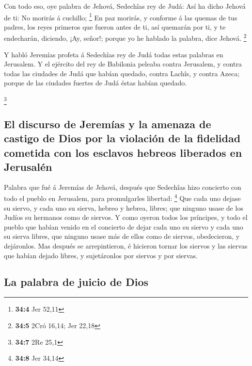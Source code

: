  Con todo eso, oye palabra de Jehová, Sedechîas rey de
Judá: Así ha dicho Jehová de ti: No morirás á cuchillo; \footnote{\textbf{34:4}
  Jer 52,11}  En paz morirás, y conforme á las quemas de
tus padres, los reyes primeros que fueron antes de ti, así quemarán por
ti, y te endecharán, diciendo, ¡Ay, señor!; porque yo he hablado la
palabra, dice Jehová. \footnote{\textbf{34:5} 2Cró 16,14; Jer 22,18}

 Y habló Jeremías profeta á Sedechîas rey de Judá todas
estas palabras en Jerusalem.  Y el ejército del rey de
Babilonia peleaba contra Jerusalem, y contra todas las ciudades de Judá
que habían quedado, contra Lachîs, y contra Azeca; porque de las
ciudades fuertes de Judá éstas habían quedado.

\footnote{\textbf{34:7} 2Re 25,1}

\hypertarget{el-discurso-de-jeremuxedas-y-la-amenaza-de-castigo-de-dios-por-la-violaciuxf3n-de-la-fidelidad-cometida-con-los-esclavos-hebreos-liberados-en-jerusaluxe9n}{%
\subsection{El discurso de Jeremías y la amenaza de castigo de Dios por
la violación de la fidelidad cometida con los esclavos hebreos liberados
en
Jerusalén}\label{el-discurso-de-jeremuxedas-y-la-amenaza-de-castigo-de-dios-por-la-violaciuxf3n-de-la-fidelidad-cometida-con-los-esclavos-hebreos-liberados-en-jerusaluxe9n}}

 Palabra que fué á Jeremías de Jehová, después que
Sedechîas hizo concierto con todo el pueblo en Jerusalem, para
promulgarles libertad: \footnote{\textbf{34:8} Jer 34,14} 
Que cada uno dejase su siervo, y cada uno su sierva, hebreo y hebrea,
libres; que ninguno usase de los Judíos su hermanos como de siervos.
 Y como oyeron todos los príncipes, y todo el pueblo que
habían venido en el concierto de dejar cada uno su siervo y cada uno su
sierva libres, que ninguno usase más de ellos como de siervos,
obedecieron, y dejáronlos.  Mas después se arrepintieron,
é hicieron tornar los siervos y las siervas que habían dejado libres, y
sujetáronlos por siervos y por siervas.

\hypertarget{la-palabra-de-juicio-de-dios}{%
\subsection{La palabra de juicio de
Dios}\label{la-palabra-de-juicio-de-dios}}

